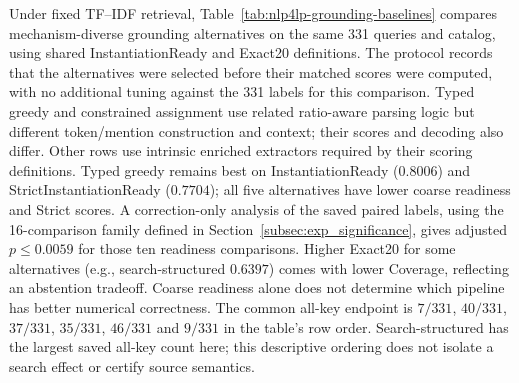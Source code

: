 \documentclass[pdflatex,sn-basic,Numbered]{sn-jnl}
\begin{document}
Under fixed TF--IDF retrieval, Table~\ref{tab:nlp4lp-grounding-baselines} compares mechanism-diverse grounding alternatives on the same 331 queries and catalog, using shared InstantiationReady and Exact20 definitions. The protocol records that the alternatives were selected before their matched scores were computed, with no additional tuning against the 331 labels for this comparison. Typed greedy and constrained assignment use related ratio-aware parsing logic but different token/mention construction and context; their scores and decoding also differ. Other rows use intrinsic enriched extractors required by their scoring definitions. Typed greedy remains best on InstantiationReady ($0.8006$) and StrictInstantiationReady ($0.7704$); all five alternatives have lower coarse readiness and Strict scores. A correction-only analysis of the saved paired labels, using the 16-comparison family defined in Section~\ref{subsec:exp_significance}, gives adjusted $p\leq0.0059$ for those ten readiness comparisons. Higher Exact20 for some alternatives (e.g., search-structured $0.6397$) comes with lower Coverage, reflecting an abstention tradeoff. Coarse readiness alone does not determine which pipeline has better numerical correctness. The common all-key endpoint is $7/331$, $40/331$, $37/331$, $35/331$, $46/331$ and $9/331$ in the table's row order. Search-structured has the largest saved all-key count here; this descriptive ordering does not isolate a search effect or certify source semantics.
\end{document}
